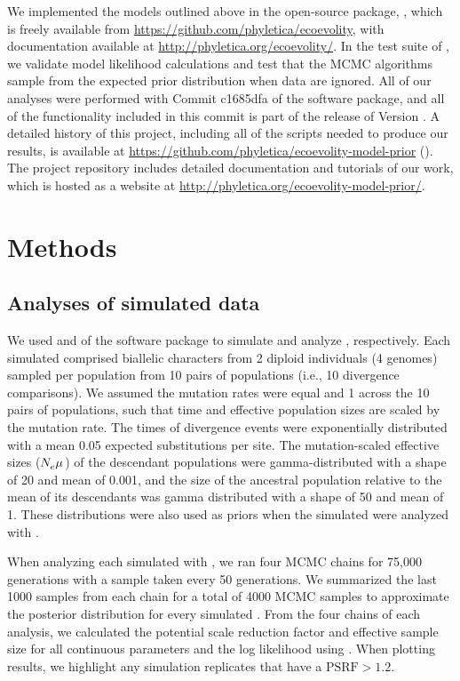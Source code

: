 \documentclass[letterpaper,12pt]{article}
\begin{document}
We implemented the models outlined above in the open-source \cpp package,
\ecoevolity, which is freely available from
\url{https://github.com/phyletica/ecoevolity}, with documentation available
at
\url{http://phyletica.org/ecoevolity/}.
In the test suite of \ecoevolity, we validate model likelihood calculations and
test that the MCMC algorithms sample from the expected prior distribution when
data are ignored.
All of our analyses were performed with
Commit c1685dfa
of the \ecoevolity software package,
and all of the functionality included in this commit is part of
the release of Version .
A detailed history of this project, including all of the scripts
needed to produce our results, is available at
\url{https://github.com/phyletica/ecoevolity-model-prior}
().
The project repository includes detailed documentation and tutorials of our
work, which is hosted as a website at
\url{http://phyletica.org/ecoevolity-model-prior/}.

\section{Methods}

\subsection{Analyses of simulated data}

We used \simcoevolity and \ecoevolity of the \ecoevolity software
package
\citep[Commit c1685dfa][]{Oaks2018ecoevolity}
to simulate and analyze \datasets, respectively.
Each simulated \dataset comprised biallelic characters from 2 diploid
individuals (4 genomes) sampled per population from 10 pairs of populations
(i.e., 10 divergence comparisons).
We assumed the mutation rates were equal and 1 across the 10 pairs of
populations, such that time and effective population sizes are scaled by the
mutation rate.
The times of divergence events were exponentially distributed with a mean 0.05
expected substitutions per site.
The mutation-scaled effective sizes ($N_{e}^{}\mu_{}$) of the descendant
populations were gamma-distributed with a shape of 20 and mean of 0.001,
and the size of the ancestral population relative to the mean of its
descendants was gamma distributed with a shape of 50 and mean of 1.
These distributions were also used as priors when the simulated \datasets were
analyzed with \ecoevolity.


When analyzing each simulated \dataset with \ecoevolity,
we ran four MCMC chains for 75,000 generations with a sample taken every 50
generations.
We summarized the last 1000 samples from each chain for a total of 4000 MCMC
samples to approximate the posterior distribution for every simulated \dataset.
From the four chains of each analysis, we calculated the potential
scale reduction factor \citep[PSRF; the square root of Equation 1.1
in][]{Brooks1998} and effective sample size \citep[ESS;][]{Gong2014} for all
continuous parameters and the log likelihood using
\pycoevolity \citep[Commit 27cb15e5;][]{Oaks2018ecoevolity}.
When plotting results, we highlight any simulation replicates that have a
$\textrm{PSRF} > 1.2$.
\end{document}
